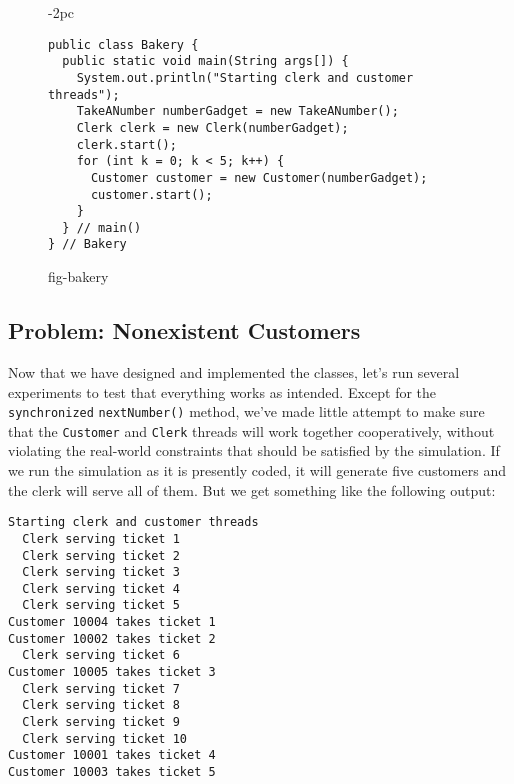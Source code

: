 \begin{figure}[h!]
\jjjprogstart
\begin{jjjlistingleft}[28pc]{-2pc}
\begin{lstlisting}
public class Bakery {
  public static void main(String args[]) {
    System.out.println("Starting clerk and customer threads");
    TakeANumber numberGadget = new TakeANumber();
    Clerk clerk = new Clerk(numberGadget);
    clerk.start();
    for (int k = 0; k < 5; k++) {
      Customer customer = new Customer(numberGadget);
      customer.start();
    }
  } // main()
} // Bakery
\end{lstlisting}
\end{jjjlistingleft}
{fig-bakery}
\end{figure}

\subsection*{Problem: Nonexistent Customers}
\noindent Now that we have designed and implemented the classes, let's run
several experiments to test that everything works as intended.  Except
for the {\tt synchronized} {\tt nextNumber()} method, we've made
little attempt to make sure that the {\tt Customer} and {\tt Clerk}
threads will work together cooperatively, without violating the
real-world constraints that should be satisfied by the simulation.   If
we run the simulation as it is presently coded, it will generate five
customers and the clerk will serve all of them.  But we get something
like the following output:


\begin{jjjlisting}
\begin{lstlisting}
Starting clerk and customer threads
  Clerk serving ticket 1
  Clerk serving ticket 2
  Clerk serving ticket 3
  Clerk serving ticket 4
  Clerk serving ticket 5
Customer 10004 takes ticket 1
Customer 10002 takes ticket 2
  Clerk serving ticket 6
Customer 10005 takes ticket 3
  Clerk serving ticket 7
  Clerk serving ticket 8
  Clerk serving ticket 9
  Clerk serving ticket 10
Customer 10001 takes ticket 4
Customer 10003 takes ticket 5
\end{lstlisting}
\end{jjjlisting}

